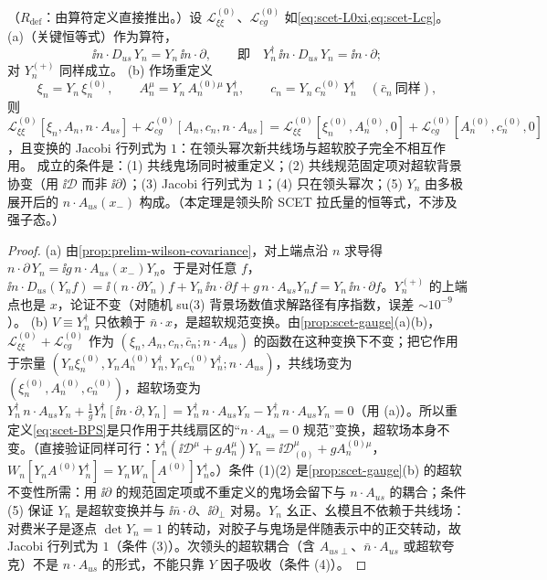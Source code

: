 \begin{theorem}\label{thm:scet-decoupling}
（$R_{\mathrm{def}}$：由算符定义直接推出。）设 $\mathcal L^{(0)}_{\xi\xi}$、$\mathcal L^{(0)}_{cg}$ 如\cref{eq:scet-L0xi,eq:scet-Lcg}。
(a)（关键恒等式）作为算符，
\begin{equation}\label{eq:scet-key}
\ii n\cdot D_{us}\,Y_n=Y_n\,\ii n\cdot\partial,\qquad\text{即}\quad Y_n^\dagger\,\ii n\cdot D_{us}\,Y_n=\ii n\cdot\partial ;
\end{equation}
对 $Y_n^{(+)}$ 同样成立。
(b) 作场重定义
\begin{equation}\label{eq:scet-BPS}
\xi_n=Y_n\,\xi_n^{(0)},\qquad A_n^\mu=Y_n\,A_n^{(0)\mu}\,Y_n^\dagger,\qquad c_n=Y_n\,c_n^{(0)}\,Y_n^\dagger\quad(\bar c_n\ \text{同样}),
\end{equation}
则 $\mathcal L^{(0)}_{\xi\xi}[\xi_n,A_n,n\cdot A_{us}]+\mathcal L^{(0)}_{cg}[A_n,c_n,n\cdot A_{us}]=\mathcal L^{(0)}_{\xi\xi}[\xi^{(0)}_n,A^{(0)}_n,0]+\mathcal L^{(0)}_{cg}[A^{(0)}_n,c^{(0)}_n,0]$，且变换的 Jacobi 行列式为 $1$：在领头幂次新共线场与超软胶子完全不相互作用。
成立的条件是：(1) 共线鬼场同时被重定义；(2) 共线规范固定项对超软背景协变（用 $\ii\mathcal D$ 而非 $\ii\partial$）；(3) Jacobi 行列式为 $1$；(4) 只在领头幂次；(5) $Y_n$ 由多极展开后的 $n\cdot A_{us}(x_-)$ 构成。（本定理是领头阶 SCET 拉氏量的恒等式，不涉及强子态。）
\end{theorem}

\begin{proof}
(a) 由\cref{prop:prelim-wilson-covariance}，对上端点沿 $n$ 求导得 $n\cdot\partial\,Y_n=\ii g\,n\cdot A_{us}(x_-)Y_n$。于是对任意 $f$，
$\ii n\cdot D_{us}(Y_nf)=\ii(n\cdot\partial Y_n)f+Y_n\,\ii n\cdot\partial f+g\,n\cdot A_{us}Y_nf=Y_n\,\ii n\cdot\partial f$。$Y_n^{(+)}$ 的上端点也是 $x$，论证不变（对随机 su(3) 背景场数值求解路径有序指数，误差 $\sim10^{-9}$）。%
(b) $V\equiv Y_n^\dagger$ 只依赖于 $\bar n\cdot x$，是超软规范变换。由\cref{prop:scet-gauge}(a)(b)，$\mathcal L^{(0)}_{\xi\xi}+\mathcal L^{(0)}_{cg}$ 作为 $(\xi_n,A_n,c_n,\bar c_n;n\cdot A_{us})$ 的函数在这种变换下不变；把它作用于宗量 $(Y_n\xi^{(0)}_n,Y_nA^{(0)}_nY_n^\dagger,Y_nc^{(0)}_nY_n^\dagger;n\cdot A_{us})$，共线场变为 $(\xi^{(0)}_n,A^{(0)}_n,c^{(0)}_n)$，超软场变为
$Y_n^\dagger\,n\cdot A_{us}Y_n+\frac1gY_n^\dagger[\ii n\cdot\partial,Y_n]=Y_n^\dagger\,n\cdot A_{us}Y_n-Y_n^\dagger\,n\cdot A_{us}Y_n=0$（用 (a)）。所以重定义\cref{eq:scet-BPS}是只作用于共线扇区的“$n\cdot A_{us}=0$ 规范”变换，超软场本身不变。（直接验证同样可行：$Y_n^\dagger(\ii\mathcal D^\mu+gA_n^\mu)Y_n=\ii\mathcal D^\mu_{(0)}+gA_n^{(0)\mu}$，$W_n[Y_nA^{(0)}Y_n^\dagger]=Y_nW_n[A^{(0)}]Y_n^\dagger$。）条件 (1)(2) 是\cref{prop:scet-gauge}(b) 的超软不变性所需：用 $\ii\partial$ 的规范固定项或不重定义的鬼场会留下与 $n\cdot A_{us}$ 的耦合；条件 (5) 保证 $Y_n$ 是超软变换并与 $\ii\bar n\cdot\partial$、$\ii\partial_\perp$ 对易。$Y_n$ 幺正、幺模且不依赖于共线场：对费米子是逐点 $\det Y_n=1$ 的转动，对胶子与鬼场是伴随表示中的正交转动，故 Jacobi 行列式为 $1$（条件 (3)）。次领头的超软耦合（含 $A_{us\perp}$、$\bar n\cdot A_{us}$ 或超软夸克）不是 $n\cdot A_{us}$ 的形式，不能只靠 $Y$ 因子吸收\cite{BauerPirjolStewart2002}（条件 (4)）。
\end{proof}

